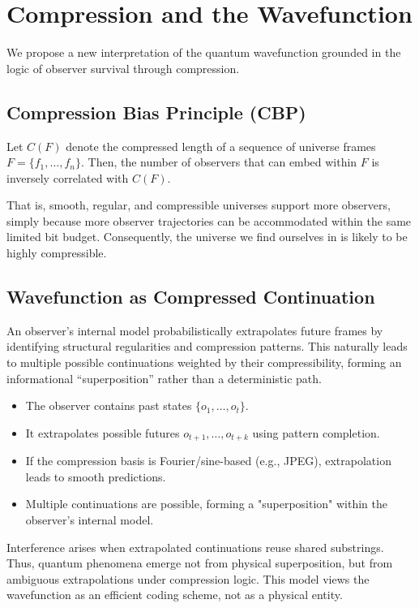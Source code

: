 \documentclass[12pt]{article}
\begin{document}
\section{Compression and the Wavefunction}

We propose a new interpretation of the quantum wavefunction grounded in the logic of observer survival through compression.

\subsection{Compression Bias Principle (CBP)}

Let $C(F)$ denote the compressed length of a sequence of universe frames $F = \{f_1, \ldots, f_n\}$. Then, the number of observers that can embed within $F$ is inversely correlated with $C(F)$.

That is, smooth, regular, and compressible universes support more observers, simply because more observer trajectories can be accommodated within the same limited bit budget. Consequently, the universe we find ourselves in is likely to be highly compressible.

\subsection{Wavefunction as Compressed Continuation}

An observer’s internal model probabilistically extrapolates future frames by identifying structural regularities and compression patterns. This naturally leads to multiple possible continuations weighted by their compressibility, forming an informational “superposition” rather than a deterministic path.

\begin{itemize}
      \item The observer contains past states $\{o_1, \ldots, o_t\}$.
      \item It extrapolates possible futures $o_{t+1}, \ldots, o_{t+k}$ using pattern completion.
      \item If the compression basis is Fourier/sine-based (e.g., JPEG), extrapolation leads to smooth predictions.
      \item Multiple continuations are possible, forming a "superposition" within the observer's internal model.
\end{itemize}

Interference arises when extrapolated continuations reuse shared substrings. Thus, quantum phenomena emerge not from physical superposition, but from ambiguous extrapolations under compression logic. This model views the wavefunction as an efficient coding scheme, not as a physical entity.
\end{document}
